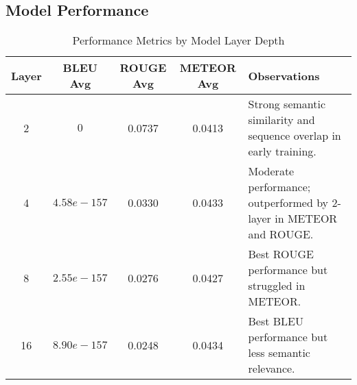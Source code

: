 \documentclass[11pt]{article}
\begin{document}
\subsection{Model Performance}
\begin{table*}[t] %
\centering
\caption{Performance Metrics by Model Layer Depth} %
\label{tab:performance_metrics} %
\begin{tabular}{|c|c|c|c|p{7cm}|} %
\hline
\textbf{Layer} & \textbf{BLEU Avg} & \textbf{ROUGE Avg} & \textbf{METEOR Avg} & \textbf{Observations} \\ \hline
2              & $0$                 & 0.0737             & 0.0413              & Strong semantic similarity and sequence overlap in early training. \\ \hline
4              & $4.58e-157$            & 0.0330             & 0.0433              & Moderate performance; outperformed by 2-layer in METEOR and ROUGE. \\ \hline
8              & $2.55e-157$            & 0.0276             & 0.0427              & Best ROUGE performance but struggled in METEOR. \\ \hline
16             & $8.90e-157$            & 0.0248             & 0.0434              & Best BLEU performance but less semantic relevance. \\ \hline
\end{tabular}
\end{table*}
\end{document}
